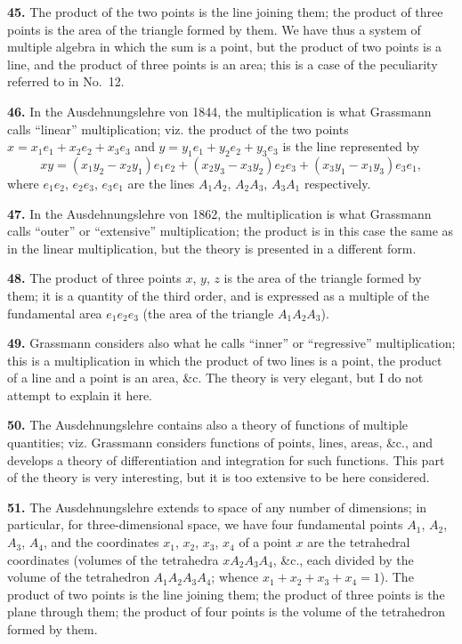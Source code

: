 \documentclass[11pt,a4paper]{article}
\theoremstyle{definition}
\begin{document}
\textbf{45.} The product of the two points is the line joining them; the product of three points is the area of the triangle formed by them. We have thus a system of multiple algebra in which the sum is a point, but the product of two points is a line, and the product of three points is an area; this is a case of the peculiarity referred to in No.~12.

\textbf{46.} In the Ausdehnungslehre von 1844, the multiplication is what Grassmann calls ``linear'' multiplication; viz. the product of the two points $x = x_1e_1 + x_2e_2 + x_3e_3$ and $y = y_1e_1 + y_2e_2 + y_3e_3$ is the line represented by
\[
xy = (x_1y_2 - x_2y_1)e_1e_2 + (x_2y_3 - x_3y_2)e_2e_3 + (x_3y_1 - x_1y_3)e_3e_1,
\]
where $e_1e_2$, $e_2e_3$, $e_3e_1$ are the lines $A_1A_2$, $A_2A_3$, $A_3A_1$ respectively.

\textbf{47.} In the Ausdehnungslehre von 1862, the multiplication is what Grassmann calls ``outer'' or ``extensive'' multiplication; the product is in this case the same as in the linear multiplication, but the theory is presented in a different form.

\textbf{48.} The product of three points $x$, $y$, $z$ is the area of the triangle formed by them; it is a quantity of the third order, and is expressed as a multiple of the fundamental area $e_1e_2e_3$ (the area of the triangle $A_1A_2A_3$).

\textbf{49.} Grassmann considers also what he calls ``inner'' or ``regressive'' multiplication; this is a multiplication in which the product of two lines is a point, the product of a line and a point is an area, \&c. The theory is very elegant, but I do not attempt to explain it here.

\textbf{50.} The Ausdehnungslehre contains also a theory of functions of multiple quantities; viz. Grassmann considers functions of points, lines, areas, \&c., and develops a theory of differentiation and integration for such functions. This part of the theory is very interesting, but it is too extensive to be here considered.

\textbf{51.} The Ausdehnungslehre extends to space of any number of dimensions; in particular, for three-dimensional space, we have four fundamental points $A_1$, $A_2$, $A_3$, $A_4$, and the coordinates $x_1$, $x_2$, $x_3$, $x_4$ of a point $x$ are the tetrahedral coordinates (volumes of the tetrahedra $xA_2A_3A_4$, \&c., each divided by the volume of the tetrahedron $A_1A_2A_3A_4$; whence $x_1 + x_2 + x_3 + x_4 = 1$). The product of two points is the line joining them; the product of three points is the plane through them; the product of four points is the volume of the tetrahedron formed by them.
\end{document}
